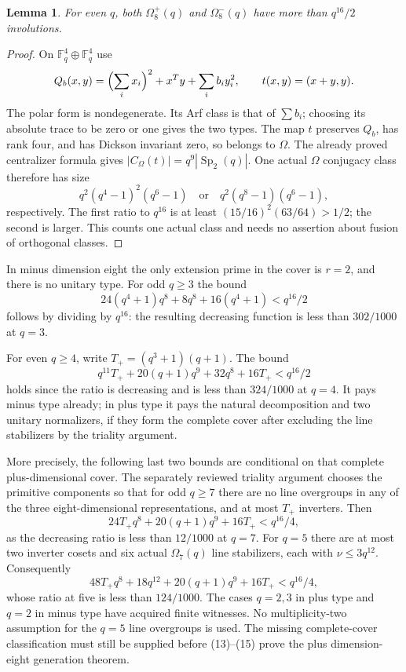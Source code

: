 \documentclass[11pt,a4paper]{article}
\newtheorem{lemma}{Lemma}\newtheorem{proposition}[lemma]{Proposition}
\newcommand{\F}{\mathbb F}\newcommand{\Om}{\Omega}
\newcommand{\Sp}{\operatorname{Sp}}\newcommand{\Aut}{\operatorname{Aut}}
\begin{document}
\begin{lemma}\label{evenlower}
For even $q$, both $\Om^+_8(q)$ and $\Om^-_8(q)$ have more than
$q^{16}/2$ involutions.
\end{lemma}
\begin{proof}
On $\F_q^4\oplus\F_q^4$ use
\[
 Q_b(x,y)=\Bigl(\sum_i x_i\Bigr)^2+x^Ty+\sum_i b_i y_i^2,
 \qquad t(x,y)=(x+y,y).
\]
The polar form is nondegenerate. Its Arf class is that of $\sum b_i$;
choosing its absolute trace to be zero or one gives the two types.
The map $t$ preserves $Q_b$, has rank four, and has Dickson invariant
zero, so belongs to $\Om$. The already proved centralizer formula
gives $|C_{\Om}(t)|=q^9|\Sp_2(q)|$. One actual $\Om$ conjugacy
class therefore has size
\[
 q^2(q^4-1)^2(q^6-1)\quad\text{or}\quad
 q^2(q^8-1)(q^6-1),
\]
respectively. The first ratio to $q^{16}$ is at least
$(15/16)^2(63/64)>1/2$; the second is larger. This counts one
actual class and needs no assertion about fusion of orthogonal classes.
\end{proof}

In minus dimension eight the only extension prime in the cover is
$r=2$, and there is no unitary type. For odd $q\ge3$ the bound
\[
 24(q^4+1)q^8+8q^8+16(q^4+1)<q^{16}/2                       \tag{12}
\]
follows by dividing by $q^{16}$: the resulting decreasing function
is less than $302/1000$ at $q=3$.

For even $q\ge4$, write $T_+=(q^3+1)(q+1)$. The bound
\[
 q^{11}T_++20(q+1)q^9+32q^8+16T_+<q^{16}/2                \tag{13}
\]
holds since the ratio is decreasing and is less than $324/1000$ at
$q=4$. It pays minus type already; in plus type it pays the natural
decomposition and two unitary normalizers, if they form the complete
cover after excluding the line stabilizers by the triality argument.

More precisely, the following last two bounds are conditional on
that complete plus-dimensional cover. The separately reviewed triality
argument chooses the primitive components so that for odd $q\ge7$
there are no line overgroups in any of the three eight-dimensional
representations, and at most $T_+$ inverters. Then
\[
 24T_+q^8+20(q+1)q^9+16T_+<q^{16}/4,                       \tag{14}
\]
as the decreasing ratio is less than $12/1000$ at $q=7$.
For $q=5$ there are at most two inverter cosets and six actual
$\Om_7(q)$ line stabilizers, each with $\nu\le3q^{12}$.
Consequently
\[
 48T_+q^8+18q^{12}+20(q+1)q^9+16T_+<q^{16}/4,              \tag{15}
\]
whose ratio at five is less than $124/1000$.
The cases $q=2,3$ in plus type and $q=2$ in minus type have acquired
finite witnesses. No multiplicity-two assumption for the $q=5$ line
overgroups is used. The missing complete-cover classification must
still be supplied before (13)--(15) prove the plus dimension-eight
generation theorem.
\end{document}

